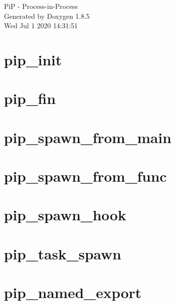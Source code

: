 \documentclass[twoside]{book}
\newcommand{\clearemptydoublepage}{%
  \newpage{\pagestyle{empty}\cleardoublepage}%
}
\begin{document}
\hypersetup{pageanchor=false}
\begin{titlepage}
\vspace*{7cm}
\begin{center}%
{\Large Pi\-P -\/ Process-\/in-\/\-Process }\\
\vspace*{1cm}
{\large Generated by Doxygen 1.8.5}\\
\vspace*{0.5cm}
{\small Wed Jul 1 2020 14:31:51}\\
\end{center}
\end{titlepage}
\clearemptydoublepage
\tableofcontents
\clearemptydoublepage
{}
\hypersetup{pageanchor=true}

\chapter{pip\-\_\-init}
\label{pip_init}
\hypertarget{pip_init}{}

\chapter{pip\-\_\-fin}
\label{pip_fin}
\hypertarget{pip_fin}{}

\chapter{pip\-\_\-spawn\-\_\-from\-\_\-main}
\label{pip_spawn_from_main}
\hypertarget{pip_spawn_from_main}{}

\chapter{pip\-\_\-spawn\-\_\-from\-\_\-func}
\label{pip_spawn_from_func}
\hypertarget{pip_spawn_from_func}{}

\chapter{pip\-\_\-spawn\-\_\-hook}
\label{pip_spawn_hook}
\hypertarget{pip_spawn_hook}{}

\chapter{pip\-\_\-task\-\_\-spawn}
\label{pip_task_spawn}
\hypertarget{pip_task_spawn}{}

\chapter{pip\-\_\-named\-\_\-export}
\label{pip_named_export}
\hypertarget{pip_named_export}{}

\end{document}
